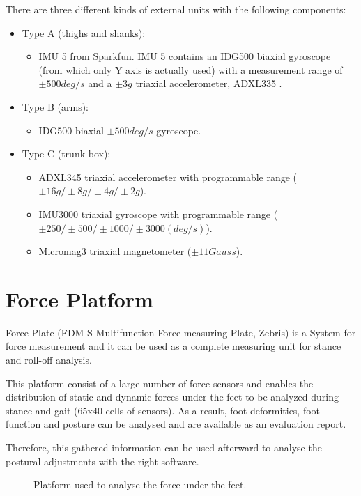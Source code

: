 There are three different kinds of external units with the following components:
\begin{itemize}
	\item Type A (thighs and shanks): 
	\begin{itemize}
		\item IMU 5 from Sparkfun. IMU 5 contains an IDG500  biaxial gyroscope (from which only Y axis is actually used) with a measurement range of $\pm500deg/s$ and a $\pm3g$ triaxial accelerometer, ADXL335 .
	\end{itemize}
	\item Type B (arms):
	\begin{itemize}
		\item IDG500  biaxial $\pm500deg/s$ gyroscope.
	\end{itemize}
	\item Type C (trunk box):
	\begin{itemize}
		\item ADXL345  triaxial accelerometer with programmable range ($\pm16g/\pm8g/\pm4g/\pm2g$).
		\item IMU3000 triaxial gyroscope with programmable range ($\pm250/\pm500/\pm1000/\pm3000 (deg/s)$).
		\item Micromag3  triaxial magnetometer ($\pm11Gauss$).
	\end{itemize}
\end{itemize}


\section{Force Platform}
Force Plate (FDM-S Multifunction Force-measuring Plate, Zebris) is a System for force measurement and it can be used as a complete measuring unit for stance and roll-off analysis. \cite{forceplate}

This platform consist of a large number of force sensors and enables the distribution of static and dynamic forces under the feet to be analyzed during stance and gait (65x40 cells of sensors). As a result, foot deformities, foot function and posture can be analysed and are available as an evaluation report. \cite{forceplate}

Therefore, this gathered information can be used afterward to analyse the postural adjustments with the right software.

\begin{figure}[H]
	\centering
	\caption{Platform used to analyse the force under the feet.}
	\label{fig:FDMS}
\end{figure}


